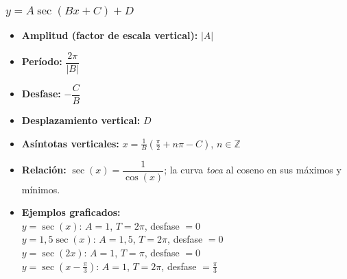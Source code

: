 \documentclass[12pt,a4paper]{article}
\begin{document}
\newpage

\subsubsection*{$y = A\sec(Bx+C)+D$}

\begin{itemize}[leftmargin=*, itemsep=3pt]
  \item \textbf{Amplitud (factor de escala vertical):} $|A|$
  \item \textbf{Período:} $\dfrac{2\pi}{|B|}$
  \item \textbf{Desfase:} $-\dfrac{C}{B}$
  \item \textbf{Desplazamiento vertical:} $D$
  \item \textbf{Asíntotas verticales:}
        $\displaystyle x = \frac{1}{B}\!\left(\frac{\pi}{2}+n\pi-C\right)$,\;
        $n\in\mathbb{Z}$ 
  \item \textbf{Relación:} $\sec(x)=\dfrac{1}{\cos(x)}$;\;
        la curva \textit{toca} al coseno en sus máximos y mínimos.
  \item \textbf{Ejemplos graficados:}\\[2pt]
        $y=\sec(x)$: $A=1$, $T=2\pi$, desfase $=0$\\
        $y=1{,}5\sec(x)$: $A=1{,}5$, $T=2\pi$, desfase $=0$\\
        $y=\sec(2x)$: $A=1$, $T=\pi$, desfase $=0$\\
        $y=\sec\!\left(x-\tfrac{\pi}{3}\right)$:
          $A=1$, $T=2\pi$, desfase $=\tfrac{\pi}{3}$
\end{itemize}
\end{document}
